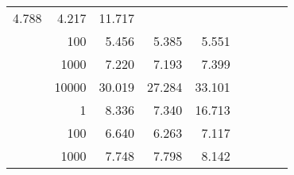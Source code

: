\begin{table}
\begin{tabular}{rrrrrrrrr}
						
							    
							    
	                           4.788 & 4.217 & 11.717  \\
	                
	            
					 &  
					 
					\multirow{ 1 }{*}{ 100 } &
					
						
							    
							    
	                           5.456 & 5.385 & 5.551  \\
	                
	            
					 &  
					 
					\multirow{ 1 }{*}{ 1000 } &
					
						
							    
							    
	                           7.220 & 7.193 & 7.399  \\
	                
	            
					 &  
					 
					\multirow{ 1 }{*}{ 10000 } &
					
						
							    
							    
	                           30.019 & 27.284 & 33.101  \\
	                
	            
	        
				\noalign{\smallskip}\hline
				\multirow{ 4 }{*}{ 1000000 } &
				
					
					 
					\multirow{ 1 }{*}{ 1 } &
					
						
							    
							    
	                           8.336 & 7.340 & 16.713  \\
	                
	            
					 &  
					 
					\multirow{ 1 }{*}{ 100 } &
					
						
							    
							    
	                           6.640 & 6.263 & 7.117  \\
	                
	            
					 &  
					 
					\multirow{ 1 }{*}{ 1000 } &
					
						
							    
							    
	                           7.748 & 7.798 & 8.142  \\
	                

\end{tabular}
\end{table}
